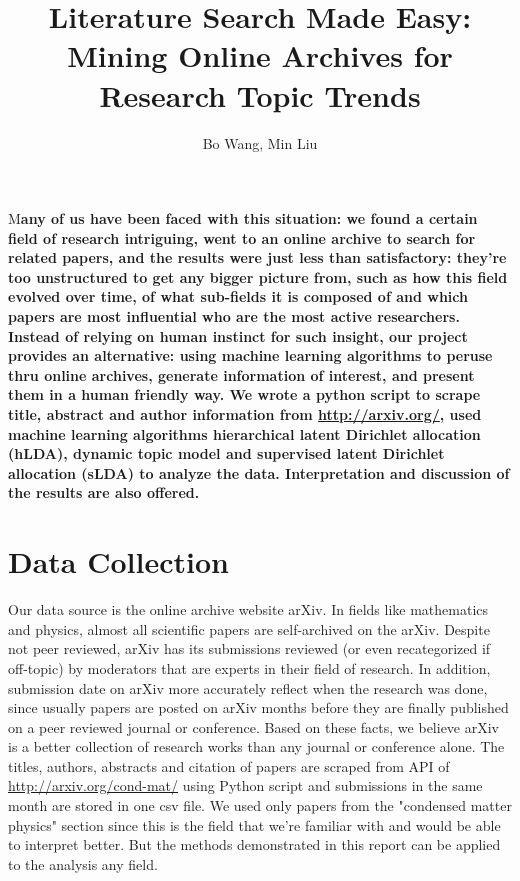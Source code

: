 \documentclass[DIV=calc, paper=a4, fontsize=11pt, twocolumn]{scrartcl}	 %
\title{\Huge Literature Search Made Easy: Mining Online Archives for Research Topic Trends} %
\author{Bo Wang, Min Liu } %
\date{} %
\newcommand{\initial}[1]{ %
\lettrine[lines=3,lhang=0.3,nindent=0em]{
\color{DarkGoldenrod}
{\textsf{#1}}}{}}
\begin{document}
\maketitle %

\thispagestyle{fancy} %


\initial{M}\textbf{any of us have been faced with this situation: we found a certain field of research intriguing, went to an online archive to search for related papers, and the results were just less than satisfactory: they're too unstructured to get any bigger picture from, such as how this field evolved over time, of what sub-fields it is composed of and which papers are most influential who are the most active researchers. Instead of relying on human instinct for such insight, our project provides an alternative: using machine learning algorithms to peruse thru online archives, generate information of interest, and present them in a human friendly way.  We wrote a python script to scrape title, abstract and author information from \url{http://arxiv.org/}, used machine learning algorithms hierarchical latent Dirichlet allocation (hLDA), dynamic topic model and supervised latent Dirichlet allocation (sLDA) to analyze the data. Interpretation and discussion of the results are also offered.}


\section*{Data Collection}

Our data source is the online archive website arXiv. In fields like mathematics and physics, almost all scientific papers are self-archived on the arXiv. Despite not peer reviewed, arXiv has its submissions reviewed (or even recategorized if off-topic) by moderators that are experts in their field of research. In addition, submission date on arXiv more accurately reflect when the research was done, since usually papers are posted on arXiv months before they are finally published on a peer reviewed journal or conference. Based on these facts, we believe arXiv is a better collection of research works than any journal or conference alone.\newline
The titles, authors, abstracts and citation of papers are scraped from API of \url{http://arxiv.org/cond-mat/} using Python script and submissions in the same month are stored in one csv file. We used only papers from the "condensed matter physics" section since this is the field that we're familiar with and would be able to interpret better. But the methods demonstrated in this report can be applied to the analysis any field.
\end{document}
